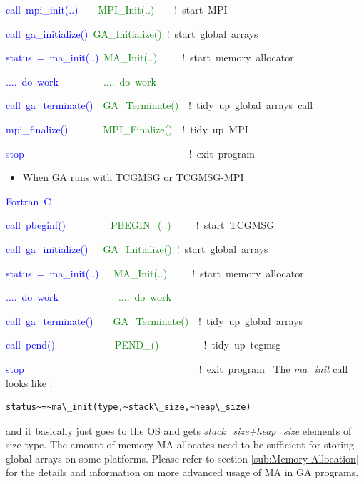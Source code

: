 \textcolor{blue}{call~mpi\_init(..)~}~~~\textcolor{green}{MPI\_Init(..)~}~~~!~start~MPI~

\textcolor{blue}{call~ga\_initialize()}~\textcolor{green}{GA\_Initialize()~}!~start~global~arrays~

\textcolor{blue}{status~=~ma\_init(..)}~\textcolor{green}{MA\_Init(..)~}~~~~!~start~memory~allocator

\textcolor{blue}{....~do~work~~}~~~~~~~\textcolor{green}{....~do~work}

\textcolor{blue}{call~ga\_terminate()}~~\textcolor{green}{GA\_Terminate()~}~!~tidy~up~global~arrays~call

\textcolor{blue}{mpi\_finalize()}~~~~~~~\textcolor{green}{MPI\_Finalize()}~~!~tidy~up~MPI~~

\textcolor{blue}{stop}~~~~~~~~~~~~~~~~~~~~~~~~~~~~~~~~~!~exit~program
\begin{itemize}
\item When GA runs with TCGMSG or TCGMSG-MPI\end{itemize}
\textcolor{blue}{Fortran~C}

\textcolor{blue}{call~pbeginf()~}~~~~~~~~\textcolor{green}{PBEGIN\_(..)~}~~~~!~start~TCGMSG~

\textcolor{blue}{call~ga\_initialize()}~~~\textcolor{green}{GA\_Initialize()}~!~start~global~arrays~

\textcolor{blue}{status~=~ma\_init(..)}~~~\textcolor{green}{MA\_Init(..)}~~~~~!~start~memory~allocator

\textcolor{blue}{....~do~work~}~~~~~~~~~~~\textcolor{green}{....~do~work}

\textcolor{blue}{call~ga\_terminate()}~~~~\textcolor{green}{GA\_Terminate()~}~!~tidy~up~global~arrays~

\textcolor{blue}{call~pend()}~~~~~~~~~~~~\textcolor{green}{PEND\_()}~~~~~~~~~!~tidy~up~tcgmsg~

\textcolor{blue}{stop~}~~~~~~~~~~~~~~~~~~~~~~~~~~~~~~~~~~!~exit~program~
The \emph{ma\_init }call looks like :
\begin{verbatim}
status~=~ma\_init(type,~stack\_size,~heap\_size)
\end{verbatim}
and it basically just goes to the OS and gets \emph{stack\_size+heap\_size}
elements of size type. The amount of memory MA allocates need to be
sufficient for storing global arrays on some platforms. Please refer
to section \ref{sub:Memory-Allocation} for the details and information
on more advanced usage of MA in GA programs. 


